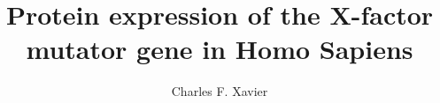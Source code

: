 \documentclass[10pt,a4paper,twoside,openany]{oxengthesis}
\title      {Protein expression of the X-factor mutator gene in Homo Sapiens}
\author     {Charles F. Xavier}
\begin{document}
\frontmatter


\makefrontmatterpages

\mainmatter









\appendix




\backmatter 

\listofreferences
\end{document}
